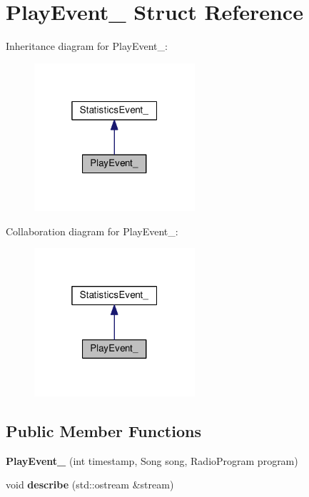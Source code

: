 \hypertarget{struct_play_event__}{}\section{Play\+Event\+\_\+ Struct Reference}
\label{struct_play_event__}


Inheritance diagram for Play\+Event\+\_\+\+:
\nopagebreak
\begin{figure}[H]
\begin{center}
\leavevmode
\includegraphics[width=169pt]{struct_play_event____inherit__graph}
\end{center}
\end{figure}


Collaboration diagram for Play\+Event\+\_\+\+:
\nopagebreak
\begin{figure}[H]
\begin{center}
\leavevmode
\includegraphics[width=169pt]{struct_play_event____coll__graph}
\end{center}
\end{figure}
\subsection*{Public Member Functions}
\begin{DoxyCompactItemize}
\item 
{\bfseries Play\+Event\+\_\+} (int timestamp, Song song, Radio\+Program program)\hypertarget{struct_play_event___a15a9f81556966a05fff2acf905e48671}{}\label{struct_play_event___a15a9f81556966a05fff2acf905e48671}

\item 
void {\bfseries describe} (std\+::ostream \&stream)\hypertarget{struct_play_event___aedfc9251d901dac44dcba4f70692080a}{}\label{struct_play_event___aedfc9251d901dac44dcba4f70692080a}

\end{DoxyCompactItemize}
